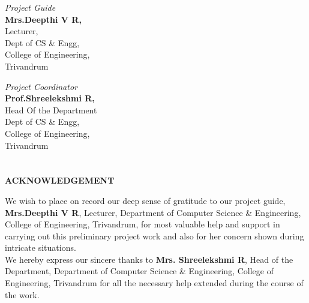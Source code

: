 \documentclass[pdftex,12pt,a4paper,pdfencoding=unicode]{article}
\begin{document}
\begin{onehalfspace}
      \begin{minipage}{0.4\textwidth}
        \begin{flushleft}
          {
            \small \emph{Project Guide}\\
                   {\bf Mrs.Deepthi V R,}\\
                   Lecturer,\\
                   Dept of CS \& Engg,\\
                   College of Engineering,\\Trivandrum
          }
        \end{flushleft}
      \end{minipage}
      \begin{minipage}{0.4\textwidth}
        \begin{flushright}
          {
            \small
            \emph{Project Coordinator}\\
                 {\bf Prof.Shreelekshmi R,}\\
                 Head Of the Department\\
                 Dept of CS \& Engg,\\
                 College of Engineering,\\Trivandrum
          }
        \end{flushright}
      \end{minipage}
      \vfill
      \newpage
      \section*{}
      \thispagestyle{empty}
      \begin{center}
        {\bf ACKNOWLEDGEMENT}
      \end{center}
      We wish to place on record our deep sense of gratitude to our project guide, {\bf Mrs.Deepthi V R}, Lecturer, Department
      of Computer Science \& Engineering, College of Engineering, Trivandrum, for most valuable help and support in carrying out this
      preliminary project work and also for her concern shown during intricate situations.\\
      
      \indent We hereby express our sincere thanks to {\bf Mrs. Shreelekshmi R}, Head of the Department, Department of Computer 
      Science \& Engineering, College of Engineering, Trivandrum for all the necessary help extended during the course of the work.\\
      

\end{onehalfspace}
\end{document}
